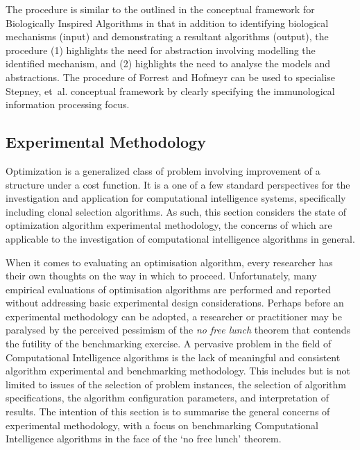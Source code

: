 The procedure is similar to the outlined in the conceptual framework for Biologically Inspired Algorithms in that in addition to identifying biological mechanisms (input) and demonstrating a resultant algorithms (output), the procedure (1) highlights the need for abstraction involving modelling the identified mechanism, and (2) highlights the need to analyse the models and abstractions. The procedure of Forrest and Hofmeyr can be used to specialise Stepney, et~al. conceptual framework by clearly specifying the immunological information processing focus.

%
% 
\subsection{Experimental Methodology}
\label{subsec:methodology:experimental}
Optimization is a generalized class of problem involving improvement of a structure under a cost function. It is a one of a few standard perspectives for the investigation and application for computational intelligence systems, specifically including clonal selection algorithms. As such, this section considers the state of optimization algorithm experimental methodology, the concerns of which are applicable to the investigation of computational intelligence algorithms in general.

When it comes to evaluating an optimisation algorithm, every researcher has their own thoughts on the way in which to proceed. Unfortunately, many empirical evaluations of optimisation algorithms are performed and reported without addressing basic experimental design considerations. Perhaps before an experimental methodology can be adopted, a researcher or practitioner may be paralysed by the perceived pessimism of the \emph{no free lunch} theorem that contends the futility of the benchmarking exercise. A pervasive problem in the field of Computational Intelligence algorithms is the lack of meaningful and consistent algorithm experimental and benchmarking methodology. This includes but is not limited to issues of the selection of problem instances, the selection of algorithm specifications, the algorithm configuration parameters, and interpretation of results. The intention of this section is to summarise the general concerns of experimental methodology, with a focus on benchmarking Computational Intelligence algorithms in the face of the `no free lunch' theorem.

